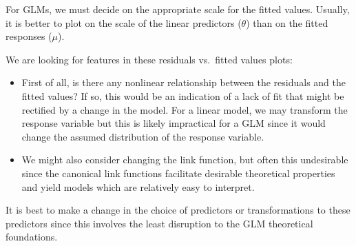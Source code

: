\documentclass[
  ignorenonframetext,
]{beamer}
\providecommand{\tightlist}{%
  \setlength{\itemsep}{0pt}\setlength{\parskip}{0pt}}
\begin{document}
\begin{frame}{}
\protect\hypertarget{section-19}{}
\small
\vspace{12pt}

For GLMs, we must decide on the appropriate scale for the fitted values.
Usually, it is better to plot on the scale of the linear predictors
(\(\theta\)) than on the fitted responses (\(\mu\)).

\vspace{12pt}

We are looking for features in these residuals vs.~fitted values plots:

\begin{itemize}
\tightlist
\item
  First of all, is there any nonlinear relationship between the
  residuals and the fitted values? If so, this would be an indication of
  a lack of fit that might be rectified by a change in the model. For a
  linear model, we may transform the response variable but this is
  likely impractical for a GLM since it would change the assumed
  distribution of the response variable.
\item
  We might also consider changing the link function, but often this
  undesirable since the canonical link functions facilitate desirable
  theoretical properties and yield models which are relatively easy to
  interpret.
\end{itemize}

\vspace{12pt}

It is best to make a change in the choice of predictors or
transformations to these predictors since this involves the least
disruption to the GLM theoretical foundations.
\end{frame}
\end{document}
